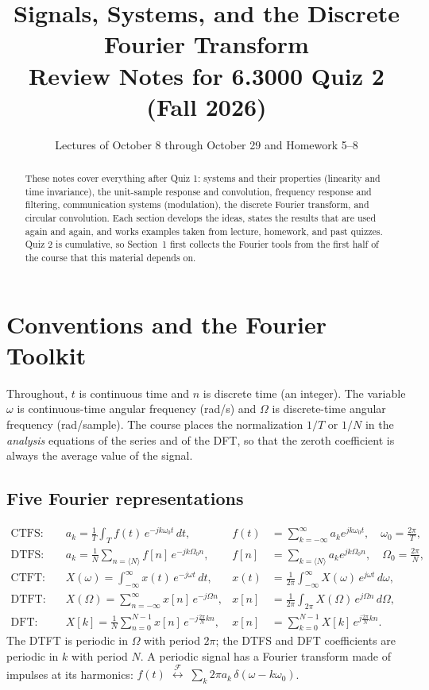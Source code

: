 \documentclass[11pt]{article}
\title{\textbf{Signals, Systems, and the Discrete Fourier Transform}\\[4pt]
\large Review Notes for 6.3000 Quiz 2 (Fall 2026)}
\author{Lectures of October 8 through October 29 and Homework 5--8}
\date{}
\numberwithin{equation}{section}
\theoremstyle{definition}
\theoremstyle{remark}
\newcommand{\ft}{\;\overset{\mathcal F}{\longleftrightarrow}\;}
\begin{document}
\maketitle
\begin{abstract}
\noindent These notes cover everything after Quiz 1: systems and their properties (linearity and time
invariance), the unit-sample response and convolution, frequency response and filtering,
communication systems (modulation), the discrete Fourier transform, and circular convolution.
Each section develops the ideas, states the results that are used again and again, and works
examples taken from lecture, homework, and past quizzes. Quiz 2 is cumulative, so Section~1
first collects the Fourier tools from the first half of the course that this material depends on.
\end{abstract}

\tableofcontents
\newpage

\section{Conventions and the Fourier Toolkit}

Throughout, $t$ is continuous time and $n$ is discrete time (an integer). The variable $\omega$
is continuous-time angular frequency (rad/s) and $\Omega$ is discrete-time angular frequency
(rad/sample). The course places the normalization $1/T$ or $1/N$ in the \emph{analysis}
equations of the series and of the DFT, so that the zeroth coefficient is always the average
value of the signal.

\subsection{Five Fourier representations}
\begin{align}
\text{CTFS:}\quad & a_k=\frac1T\int_T f(t)\,e^{-jk\omega_0t}\,dt, &
 f(t)&=\sum_{k=-\infty}^{\infty}a_k e^{jk\omega_0 t}, \quad \omega_0=\tfrac{2\pi}{T},\\
\text{DTFS:}\quad & a_k=\frac1N\sum_{n=\langle N\rangle} f[n]\,e^{-jk\Omega_0n}, &
 f[n]&=\sum_{k=\langle N\rangle}a_k e^{jk\Omega_0n}, \quad \Omega_0=\tfrac{2\pi}{N},\\
\text{CTFT:}\quad & X(\omega)=\int_{-\infty}^{\infty}x(t)\,e^{-j\omega t}\,dt, &
 x(t)&=\frac1{2\pi}\int_{-\infty}^{\infty}X(\omega)\,e^{j\omega t}\,d\omega,\\
\text{DTFT:}\quad & X(\Omega)=\sum_{n=-\infty}^{\infty}x[n]\,e^{-j\Omega n}, &
 x[n]&=\frac1{2\pi}\int_{2\pi}X(\Omega)\,e^{j\Omega n}\,d\Omega,\\
\text{DFT:}\quad & X[k]=\frac1N\sum_{n=0}^{N-1}x[n]\,e^{-j\frac{2\pi}{N}kn}, &
 x[n]&=\sum_{k=0}^{N-1}X[k]\,e^{j\frac{2\pi}{N}kn}.
\end{align}
The DTFT is periodic in $\Omega$ with period $2\pi$; the DTFS and DFT coefficients are periodic
in $k$ with period $N$. A periodic signal has a Fourier transform made of impulses at its
harmonics: $f(t)\ft\sum_k 2\pi a_k\,\delta(\omega-k\omega_0)$.
\end{document}
